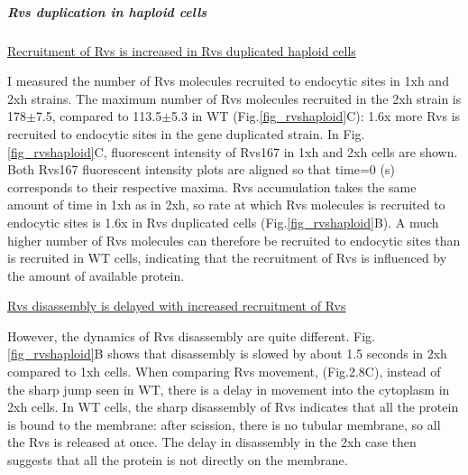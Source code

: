 \newpage
\subparagraph{Rvs duplication in haploid cells}

\newpage
  \underline{Recruitment of Rvs is increased in Rvs duplicated haploid cells}

I measured the number of Rvs molecules recruited to endocytic sites in 1xh and 2xh strains. The maximum number of Rvs molecules recruited in the 2xh strain is 178$\pm$7.5, compared to 113.5$\pm$5.3 in WT (Fig.\ref{fig_rvshaploid}C): 1.6x more Rvs is recruited to endocytic sites in the gene duplicated strain. In Fig.\ref{fig_rvshaploid}C, fluorescent intensity of Rvs167 in 1xh and 2xh cells are shown. Both Rvs167 fluorescent intensity plots are aligned so that time=0 (s) corresponds to their respective maxima. Rvs accumulation takes the same amount of time in 1xh as in 2xh, so rate at which Rvs molecules is recruited to endocytic sites is 1.6x in Rvs duplicated cells (Fig.\ref{fig_rvshaploid}B). A much higher number of Rvs molecules can therefore be recruited to endocytic sites than is recruited in  WT cells, indicating that the recruitment of Rvs is influenced by the amount of available protein.

 \vspace{5mm}
\underline{Rvs disassembly is delayed with increased recruitment of Rvs}

However, the dynamics of Rvs disassembly are quite different. Fig.\ref{fig_rvshaploid}B shows that disassembly is slowed by about 1.5 seconds in 2xh compared to 1xh cells. When comparing Rvs movement, (Fig.2.8C), instead of the sharp jump seen in WT, there is a delay in movement into the cytoplasm in 2xh cells. In WT cells, the sharp disassembly of Rvs indicates that all the protein is bound to the membrane: after scission, there is no tubular membrane, so all the Rvs is released at once. The delay in disassembly in the 2xh case then suggests that all the protein is not directly on the membrane. 
\vspace{5mm}

